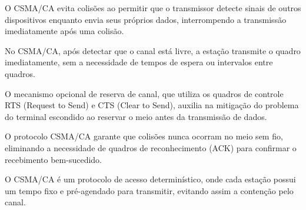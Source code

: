 \documentclass[11pt, addpoints]{modelo/prova2}
\begin{document}
    \begin{choices}
        \item O CSMA/CA evita colisões ao permitir que o transmissor detecte sinais de outros dispositivos enquanto envia seus próprios dados, interrompendo a transmissão imediatamente após uma colisão.
        \item No CSMA/CA, após detectar que o canal está livre, a estação transmite o quadro imediatamente, sem a necessidade de tempos de espera ou intervalos entre quadros.
        \item O mecanismo opcional de reserva de canal, que utiliza os quadros de controle RTS (Request to Send) e CTS (Clear to Send), auxilia na mitigação do problema do terminal escondido ao reservar o meio antes da transmissão de dados.
        \item O protocolo CSMA/CA garante que colisões nunca ocorram no meio sem fio, eliminando a necessidade de quadros de reconhecimento (ACK) para confirmar o recebimento bem-sucedido.
        \item O CSMA/CA é um protocolo de acesso determinístico, onde cada estação possui um tempo fixo e pré-agendado para transmitir, evitando assim a contenção pelo canal.
    \end{choices} 
\end{document}
